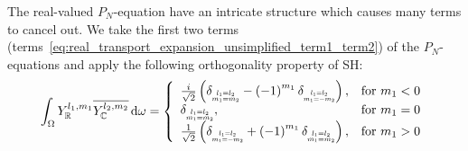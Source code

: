 \documentclass[10pt]{scrartcl}
\begin{document}
The real-valued $P_N$-equation have an intricate structure which causes many terms to cancel out. We take the first two terms (terms~\ref{eq:real_transport_expansion_unsimplified_term1_term2}) of the $P_N$-equations and apply the following orthogonality property of SH:
\begin{align}
\int_\Omega{\SHBR^{l_1, m_1}\overline{\SHBC^{l_2, m_2}}}\ud\omega
=
\left\{
\begin{array}{lr}
\frac{i}{\sqrt{2}}
\left(
\delta_{\scaleto{\substack{l_1=l_2\\m_1=m_2}}{9pt}}
-\left({-1}\right)^{m_1}
\delta_{\scaleto{\substack{l_1=l_2\\m_1=-m_2}}{9pt}}
\right)
, & \text{for } m_1 < 0
\\
\delta_{\scaleto{\substack{l_1=l_2\\m_1=m_2}}{9pt}}, & \text{for } m_1 = 0
\\
\frac{1}{\sqrt{2}}
\left(
\delta_{\scaleto{\substack{l_1=l_2\\m_1=-m_2}}{9pt}}
+\left({-1}\right)^{m_1}
\delta_{\scaleto{\substack{l_1=l_2\\m_1=m_2}}{9pt}}
\right)
, & \text{for } m_1 > 0
\end{array}
\right.
\label{eq:real_orthogonality_property_with_complex}
\end{align}
\end{document}
